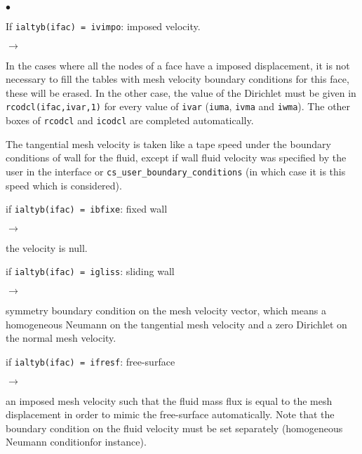 {{{\begin{list}{$\bullet$}{}

\item If \texttt{ialtyb(ifac) = ivimpo}: imposed velocity.

\begin{list}{$\rightarrow$}{}
\item In the cases where all the nodes of a face have a imposed displacement,
 it is not necessary to fill the tables with mesh velocity boundary conditions
 for this face, these will be erased. In the other case,
 the value of the Dirichlet must be given in \texttt{rcodcl(ifac,ivar,1)} for
 every value of \texttt{ivar} (\texttt{iuma}, \texttt{ivma} and \texttt{iwma}).
 The other boxes of \texttt{rcodcl} and \texttt{icodcl} are completed automatically.

 The tangential mesh velocity is taken like a tape speed under the
 boundary conditions of wall for the fluid, except if wall fluid velocity
 was specified by the user in the interface or \texttt{cs\_user\_boundary\_conditions} (in which case
 it is this speed which is considered).
\end{list}

 \item if \texttt{ialtyb(ifac) = ibfixe}: fixed wall
\begin{list}{$\rightarrow$}{}
 \item the velocity is null.
\end{list}

 \item if \texttt{ialtyb(ifac) = igliss}: sliding wall
\begin{list}{$\rightarrow$}{}
\item symmetry boundary condition on the mesh velocity vector, which means a homogeneous Neumann on the tangential mesh velocity and a zero Dirichlet on the normal mesh velocity.
\end{list}

 \item if \texttt{ialtyb(ifac) = ifresf}: free-surface
\begin{list}{$\rightarrow$}{}
\item an imposed mesh velocity such that the fluid mass flux is equal to the mesh displacement in order to mimic the free-surface automatically. Note that the boundary condition on the fluid velocity must be set separately (homogeneous Neumann conditionfor instance).
\end{list}

\end{list}
}

}}

